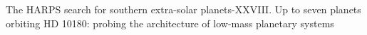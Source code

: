 

\begin{workout}
The HARPS search for southern extra-solar planets-XXVIII. Up to seven planets orbiting HD 10180: probing the architecture of low-mass planetary systems
\end{workout}
